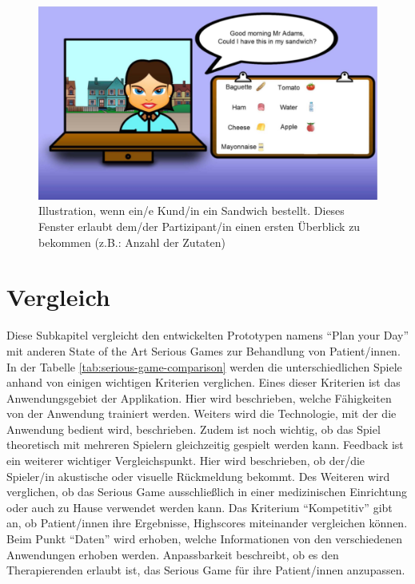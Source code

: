 \begin{figure}[h]
    \centering
    \includegraphics[width=0.7\linewidth]{figures/state_of_the_art/robigame}
    \caption{Illustration, wenn ein/e Kund/in ein Sandwich bestellt. Dieses Fenster erlaubt dem/der Partizipant/in einen ersten Überblick zu bekommen (\ac{z.B.}: Anzahl der Zutaten) \cite{heins:2017:robigame}}
    \label{fig:robigame}
\end{figure}

\section{Vergleich}
Diese Subkapitel vergleicht den entwickelten Prototypen namens \enquote{Plan your Day} mit anderen State of the Art Serious Games zur Behandlung von Patient/innen. In der Tabelle \ref{tab:serious-game-comparison} werden die unterschiedlichen Spiele anhand von einigen wichtigen Kriterien verglichen. Eines dieser Kriterien ist das Anwendungsgebiet der Applikation. Hier wird beschrieben, welche Fähigkeiten von der Anwendung trainiert werden. Weiters wird die Technologie, mit der die Anwendung bedient wird, beschrieben. Zudem ist noch wichtig, ob das Spiel theoretisch mit mehreren Spielern gleichzeitig gespielt werden kann. Feedback ist ein weiterer wichtiger Vergleichspunkt. Hier wird beschrieben, ob der/die Spieler/in akustische oder visuelle Rückmeldung bekommt. Des Weiteren wird verglichen, ob das Serious Game ausschließlich in einer medizinischen Einrichtung oder auch zu Hause verwendet werden kann. Das Kriterium \enquote{Kompetitiv} gibt an, ob Patient/innen ihre Ergebnisse, Highscores miteinander vergleichen können. Beim Punkt \enquote{Daten} wird erhoben, welche Informationen von den verschiedenen Anwendungen erhoben werden. Anpassbarkeit beschreibt, ob es den Therapierenden erlaubt ist, das Serious Game für ihre Patient/innen anzupassen.

